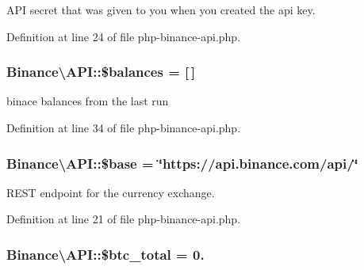 A\-P\-I secret that was given to you when you created the api key. 



Definition at line 24 of file php-\/binance-\/api.\-php.

\hypertarget{classBinance_1_1API_a706b2458b10d731ea4918714c333a845}{
\subsubsection[{\$balances}]{\setlength{\rightskip}{0pt plus 5cm}Binance\textbackslash{}\-A\-P\-I\-::\$balances = \mbox{[}$\,$\mbox{]}}}\label{classBinance_1_1API_a706b2458b10d731ea4918714c333a845}


binace balances from the last run 



Definition at line 34 of file php-\/binance-\/api.\-php.

\hypertarget{classBinance_1_1API_ac863e52396757997d84e6783b5336828}{
\subsubsection[{\$base}]{\setlength{\rightskip}{0pt plus 5cm}Binance\textbackslash{}\-A\-P\-I\-::\$base = \char`\"{}https\-://api.\-binance.\-com/api/\char`\"{}\hspace{0.3cm}{\ttfamily [protected]}}}\label{classBinance_1_1API_ac863e52396757997d84e6783b5336828}


R\-E\-S\-T endpoint for the currency exchange. 



Definition at line 21 of file php-\/binance-\/api.\-php.

\hypertarget{classBinance_1_1API_a80f67dda302da9465596ad5e0bd86ce2}{
\subsubsection[{\$btc\-\_\-total}]{\setlength{\rightskip}{0pt plus 5cm}Binance\textbackslash{}\-A\-P\-I\-::\$btc\-\_\-total = 0.}}\label{classBinance_1_1API_a80f67dda302da9465596ad5e0bd86ce2}


